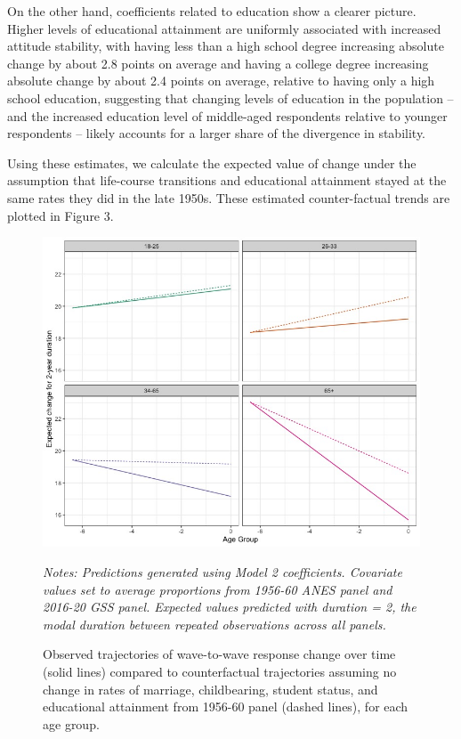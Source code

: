 \documentclass[
  12pt,
]{article}
\begin{document}
On the other hand, coefficients related to education show a clearer picture. Higher levels of educational attainment are uniformly associated with increased attitude stability, with having less than a high school degree increasing absolute change by about 2.8 points on average and having a college degree increasing absolute change by about 2.4 points on average, relative to having only a high school education, suggesting that changing levels of education in the population -- and the increased education level of middle-aged respondents relative to younger respondents -- likely accounts for a larger share of the divergence in stability.

Using these estimates, we calculate the expected value of change under the assumption that life-course transitions and educational attainment stayed at the same rates they did in the late 1950s. These estimated counter-factual trends are plotted in Figure 3.

\begin{figure}[]
\begin{center}
\caption{Observed trajectories of wave-to-wave response change over time (solid lines) compared to counterfactual trajectories assuming no change in rates of marriage, childbearing, student status, and educational attainment from 1956-60 panel (dashed lines), for each age group.}

\includegraphics[width=1\linewidth]{../figures/counterfactual_plot}

\end{center}
\footnotesize{\textit{Notes: Predictions generated using Model 2 coefficients. Covariate values set to average proportions from 1956-60 ANES panel and 2016-20 GSS panel. Expected values predicted with duration = 2, the modal duration between repeated observations across all panels.}}
\end{figure}
\end{document}
